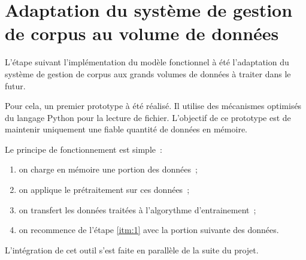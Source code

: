 \section{Adaptation du système de gestion de corpus au volume de données}
L'étape suivant l'implémentation du modèle fonctionnel à été l'adaptation du système de gestion de corpus aux grands volumes de données à traiter dans le futur.

Pour cela, un premier prototype à été réalisé.
Il utilise des mécanismes optimisés du langage Python pour la lecture de fichier.
L'objectif de ce prototype est de maintenir uniquement une fiable quantité de données en mémoire.

Le principe de fonctionnement est simple~:
\begin{enumerate}
	\item on charge en mémoire une portion des données~; \label{itm:1}
	\item on applique le prétraitement sur ces données~;
	\item on transfert les données traitées à l'algorythme d'entrainement~;
	\item on recommence de l'étape \ref{itm:1} avec la portion suivante des données.
\end{enumerate}

L'intégration de cet outil s'est faite en parallèle de la suite du projet.